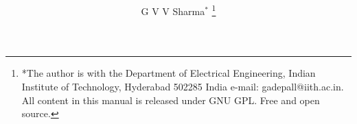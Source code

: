 \documentclass[journal,12pt,twocolumn]{IEEEtran}
\begin{document}
\let\StandardTheFigure\thefigure
\let\vec\mathbf
\renewcommand{\thefigure}{\theproblem}



\def\putbox#1#2#3{\makebox[0in][l]{\makebox[#1][l]{}\raisebox{\baselineskip}[0in][0in]{\raisebox{#2}[0in][0in]{#3}}}}
     \def\rightbox#1{\makebox[0in][r]{#1}}
     \def\centbox#1{\makebox[0in]{#1}}
     \def\topbox#1{\raisebox{-\baselineskip}[0in][0in]{#1}}
     \def\midbox#1{\raisebox{-0.5\baselineskip}[0in][0in]{#1}}

\vspace{3cm}

\title{
}
\author{ G V V Sharma$^{*}$%
	\thanks{*The author is with the Department
		of Electrical Engineering, Indian Institute of Technology, Hyderabad
		502285 India e-mail:  gadepall@iith.ac.in. All content in this manual is released under GNU GPL.  Free and open source.}
	
}	


%
%
%

% 
%
\end{document}
